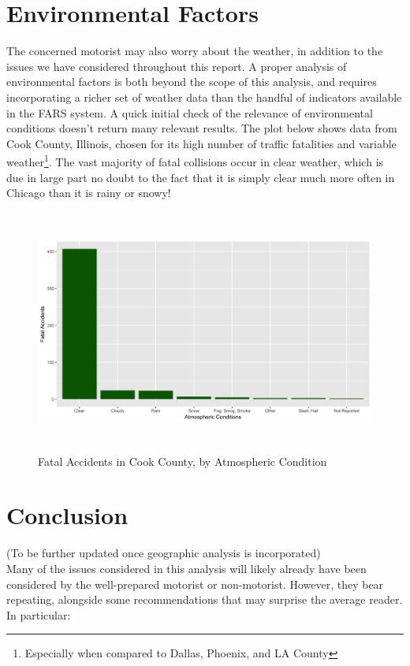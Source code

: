 \documentclass[11pt, oneside,titlepage]{article}   	%
\begin{document}
\section*{Environmental Factors}
The concerned motorist may also worry about the weather, in addition to the issues we have considered throughout this report. A proper analysis of environmental factors is both beyond the scope of this analysis, and requires incorporating a richer set of weather data than the handful of indicators available in the FARS system. A quick initial check of the relevance of environmental conditions doesn't return many relevant results. The plot below shows data from Cook County, Illinois, chosen for its high number of traffic fatalities and variable weather\footnote{Especially when compared to Dallas, Phoenix, and LA County}. The vast majority of fatal collisions occur in clear weather, which is due in large part no doubt to the fact that it is simply clear much more often in Chicago than it is rainy or snowy! 

\begin{figure}[H]
\centering
  \includegraphics[width=15cm,height=8cm,keepaspectratio]{Environmental.png}
\caption{Fatal Accidents in Cook County, by Atmospheric Condition}
\end{figure}


\section*{Conclusion}

(To be further updated once geographic analysis is incorporated) \\

Many of the issues considered in this analysis will likely already have been considered by the well-prepared motorist or non-motorist. However, they bear repeating, alongside some recommendations that may surprise the average reader. In particular:
\end{document}
